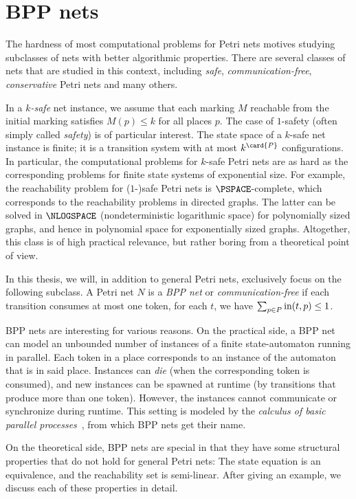 \documentclass[../../diss.tex]{subfiles}
\begin{document}
\section{BPP nets}%
\label{Section:PNBPP}%

The hardness of most computational problems for Petri nets motives studying subclasses of nets with better algorithmic properties.
There are several classes of nets that are studied in this context, including \emph{safe}, \emph{communication-free}, \emph{conservative} Petri nets and many others.

In a \emph{$k$-safe} net instance, we assume that each marking $M$ reachable from the initial marking satisfies $M(p) \leq k$ for all places $p$.
The case of $1$-safety (often simply called \emph{safety}) is of particular interest.
The state space of a $k$-safe net instance is finite; it is a transition system with at most $k^{\card{P}}$ configurations.
In particular, the computational problems for $k$-safe Petri nets are as hard as the corresponding problems for finite state systems of exponential size.
For example, the reachability problem for ($1$-)safe Petri nets is $\PSPACE$-complete, which corresponds to the reachability problems in directed graphs.
The latter can be solved in $\NLOGSPACE$ (nondeterministic logarithmic space) for polynomially sized graphs, and hence in polynomial space for exponentially sized graphs.
Altogether, this class is of high practical relevance, but rather boring from a theoretical point of view.

In this thesis, we will, in addition to general Petri nets, exclusively focus on the following subclass.
A Petri net $N$ is a \emph{BPP net} or \emph{communication-free} if each transition consumes at most one token, \ie for each $t$, we have $\sum_{p \in P} \text{in}(t,p) \leq 1$.

BPP nets are interesting for various reasons.
On the practical side, a BPP net can model an unbounded number of instances of a finite state-automaton running in parallel.
Each token in a place corresponds to an instance of the automaton that is in said place.
Instances can \emph{die} (when the corresponding token is consumed), and new instances can be spawned at runtime (by transitions that produce more than one token).
However, the instances cannot communicate or synchronize during runtime.
This setting is modeled by the \emph{calculus of basic parallel processes}~\cite{Christensen93}, from which BPP nets get their name.

On the theoretical side, BPP nets are special in that they have some structural properties that do not hold for general Petri nets:
The state equation is an equivalence, and the reachability set is semi-linear.
After giving an example, we discuss each of these properties in detail.
\end{document}
